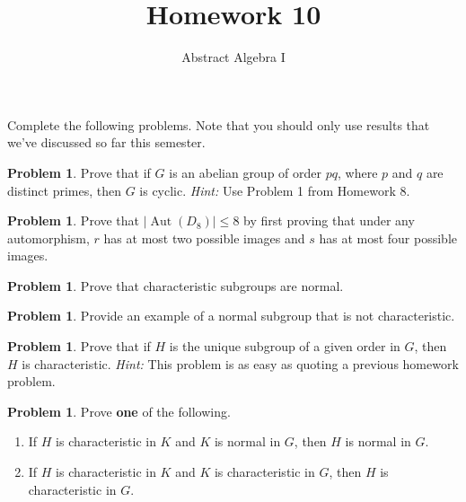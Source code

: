 \documentclass[11pt]{scrartcl}
\theoremstyle{definition}
\newtheorem{problem}[theorem]{Problem}
\DeclareMathOperator{\Aut}{Aut}
\DeclareMathOperator{\Inn}{Inn}
\begin{document}
\title{Homework 10}
\subtitle{Abstract Algebra I}
\date{}

\maketitle
\thispagestyle{fancy}

Complete the following problems. Note that you should only use results that we've discussed so far this semester.


\begin{problem}
Prove that if $G$ is an abelian group of order $pq$, where $p$ and $q$ are distinct primes, then $G$ is cyclic. \emph{Hint:} Use Problem 1 from Homework 8.
\end{problem}

\begin{problem}
Prove that $|\Aut(D_8)|\leq 8$ by first proving that under any automorphism, $r$ has at most two possible images and $s$ has at most four possible images. 
\end{problem}

\begin{problem}
Prove that characteristic subgroups are normal.
\end{problem}

\begin{problem}
Provide an example of a normal subgroup that is not characteristic.
\end{problem}

\begin{problem}
Prove that if $H$ is the unique subgroup of a given order in $G$, then $H$ is characteristic. \emph{Hint:} This problem is as easy as quoting a previous homework problem.
\end{problem}

\begin{problem}
Prove \textbf{one} of the following.
\begin{enumerate}[label=\rm{(\alph*)}]
\item If $H$ is characteristic in $K$ and $K$ is normal in $G$, then $H$ is normal in $G$.
\item If $H$ is characteristic in $K$ and $K$ is characteristic in $G$, then $H$ is characteristic in $G$.
\end{enumerate}
\end{problem}
\end{document}
